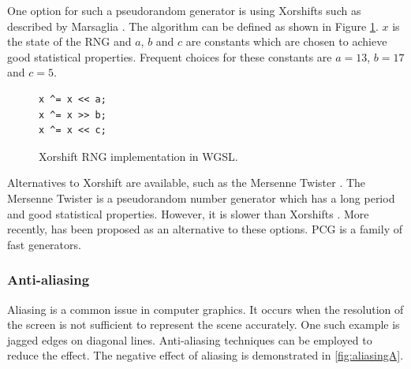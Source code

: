 One option for such a pseudorandom generator is using Xorshifts such as described by Marsaglia \cite{marsaglia2003xorshift}. The algorithm can be defined as shown in Figure \ref{code:xorShift}. $x$ is the state of the \gls{RNG} and $a$, $b$ and $c$ are constants which are chosen to achieve good statistical properties. Frequent choices for these constants are $a = 13$, $b = 17$ and $c = 5$.

\begin{figure}[H]
\begin{lstlisting}[style=wgsl]
x ^= x << a;
x ^= x >> b;
x ^= x << c;
\end{lstlisting}
\caption{Xorshift \gls{RNG} implementation in \gls{WGSL}.}
\label{code:xorShift}
\end{figure}

Alternatives to Xorshift are available, such as the Mersenne Twister \cite{rngMersenneTwister}. The Mersenne Twister is a pseudorandom number generator which has a long period and good statistical properties. However, it is slower than Xorshifts \cite{o2014pcg}. More recently,  has been proposed as an alternative to these options. \gls{PCG} is a family of fast generators.

\subsubsection{Anti-aliasing}
\label{sec:anti-aliasing}

Aliasing is a common issue in computer graphics. It occurs when the resolution of the screen is not sufficient to represent the scene accurately. One such example is jagged edges on diagonal lines. Anti-aliasing techniques can be employed to reduce the effect. The negative effect of aliasing is demonstrated in \autoref{fig:aliasingA}.

